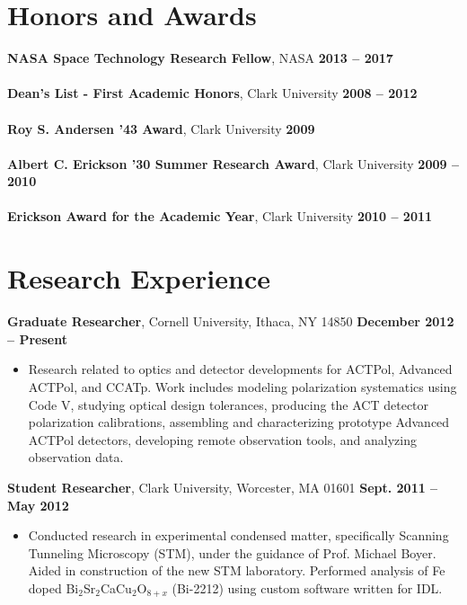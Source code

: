 \documentclass[margin,line]{res}
\begin{document}
\begin{resume}
\section{\sc Honors and Awards}  %
\textbf{NASA Space Technology Research Fellow}, NASA \hfill \textbf{2013 -- 2017}\\
\\
\textbf{Dean's List - First Academic Honors}, Clark University \hfill \textbf{2008 -- 2012}\\ 
\\
\textbf{Roy S. Andersen '43 Award}, Clark University \hfill \textbf{2009}\\ 
\\
\textbf{Albert C. Erickson '30 Summer Research Award}, Clark University \hfill \textbf{2009 -- 2010}\\ 
\\
\textbf{Erickson Award for the Academic Year}, Clark University \hfill \textbf{2010 -- 2011}\\ 

\section{\sc Research Experience}      
    \textbf{Graduate Researcher}, Cornell University, Ithaca, NY 14850 \hfill \textbf{December 2012 -- Present}
    \vspace*{1mm}
    \begin{itemize}
        \item [ ] Research related to optics and detector developments for ACTPol, 
                  Advanced ACTPol, and CCATp. Work includes modeling
                  polarization systematics using Code V, studying optical
                  design tolerances, producing the ACT detector polarization calibrations,
                  assembling and characterizing prototype Advanced ACTPol detectors, developing
                  remote observation tools, and analyzing observation data.  \end{itemize} 

    \textbf{Student Researcher}, Clark University, Worcester, MA 01601 \hfill \textbf{Sept. 2011 -- May 2012}
    \vspace*{1mm}
    \begin{itemize}
        \item [ ] Conducted research in experimental condensed matter, specifically
        Scanning Tunneling Microscopy (STM), under the guidance of Prof. Michael Boyer.
        Aided in construction of the new STM laboratory. Performed analysis of Fe doped
        Bi$_2$Sr$_2$CaCu$_2$O$_{8+x}$ (Bi-2212) using custom software written for IDL.
    \end{itemize} 


\end{resume}
\end{document}

